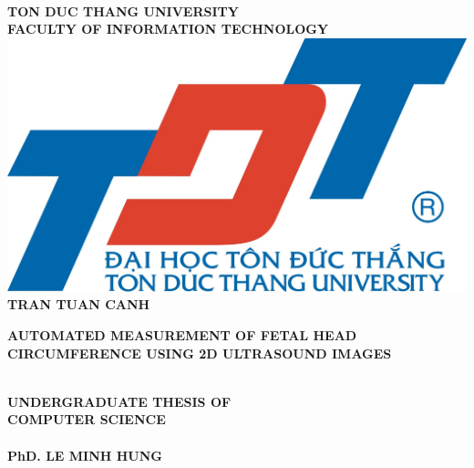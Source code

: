 \thispagestyle{empty}
\vspace{1cm}
\begin{center}
{\fontsize{14pt}{1}\selectfont {VIETNAM GENERAL CONFEDERATION OF LABOUR}}\\
{\fontsize{14pt}{1}\selectfont \textbf{TON DUC THANG UNIVERSITY}}\\
{\fontsize{14pt}{1}\selectfont \textbf{FACULTY OF INFORMATION TECHNOLOGY}}\\[1cm]
\includegraphics[scale=0.3]{./hinhanh/tdt.jpg}\\[1.7cm]
{\fontsize{14pt}{1}\selectfont \textbf{TRAN TUAN CANH}}\\[1.2cm]

{\parbox[t]{15cm}{\fontsize{22pt}{15}\selectfont 
	\begin{center}
			\textbf{AUTOMATED MEASUREMENT OF FETAL HEAD CIRCUMFERENCE USING 2D ULTRASOUND IMAGES}
	\end{center}}
}\\[1.3cm]

{\fontsize{20pt}{1}\selectfont \textbf{UNDERGRADUATE THESIS OF}}\\
{\fontsize{20pt}{1}\selectfont \textbf{COMPUTER SCIENCE}}\\[1cm]

{\fontsize{14pt}{1}\selectfont {Advised by}}\\
{\fontsize{14pt}{1}\selectfont \textbf{PhD. LE MINH HUNG}}\\

\end{center}


